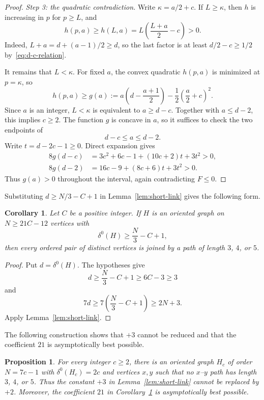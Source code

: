 \documentclass[11pt]{amsart}
\newtheorem{proposition}[theorem]{Proposition}
\newtheorem{corollary}[theorem]{Corollary}
\theoremstyle{definition}
\begin{document}
\begin{proof}
\smallskip
\noindent\emph{Step 3: the quadratic contradiction.}
Write $\kappa=a/2+c$.  If $L\ge\kappa$, then $h$ is increasing in
$p$ for $p\ge L$, and
\[
  h(p,a)\ge h(L,a)
  =L\left(\frac{L+a}{2}-c\right)>0.
\]
Indeed, $L+a=d+(a-1)/2\ge d$, so the last factor is at least
$d/2-c\ge1/2$ by~\eqref{eq:d-c-relation}.

It remains that $L<\kappa$.  For fixed $a$, the convex quadratic
$h(p,a)$ is minimized at $p=\kappa$, so
\[
  h(p,a)\ge
  g(a):=a\left(d-\frac{a+1}{2}\right)
  -\frac12\left(\frac a2+c\right)^2.
\]
Since $a$ is an integer, $L<\kappa$ is equivalent to
$a\ge d-c$.  Together with $a\le d-2$, this implies $c\ge2$.
The function $g$ is concave in $a$, so it suffices to check the two
endpoints of
\[
  d-c\le a\le d-2.
\]
Write $t=d-2c-1\ge0$.  Direct expansion gives
\begin{align*}
  8g(d-c)
  &=3c^2+6c-1+(10c+2)t+3t^2>0,\\
  8g(d-2)
  &=16c-9+(8c+6)t+3t^2>0.
\end{align*}
Thus $g(a)>0$ throughout the interval, again contradicting $F\le0$.
\end{proof}

Substituting $d\ge N/3-C+1$ in Lemma~\ref{lem:short-link} gives the
following form.

\begin{corollary}\label{cor:defect-link}
Let $C$ be a positive integer.  If $H$ is an oriented graph on
$N\ge21C-12$ vertices with
\[
  \delta^0(H)\ge\frac N3-C+1,
\]
then every ordered pair of distinct vertices is joined by a path of
length $3$, $4$, or $5$.
\end{corollary}

\begin{proof}
Put $d=\delta^0(H)$.  The hypotheses give
\[
  d\ge\frac N3-C+1\ge6C-3\ge3
\]
and
\[
  7d\ge7\left(\frac N3-C+1\right)\ge2N+3.
\]
Apply Lemma~\ref{lem:short-link}.
\end{proof}

The following construction shows that $+3$ cannot be reduced and that
the coefficient $21$ is asymptotically best possible.

\begin{proposition}\label{prop:link-sharp}
For every integer $c\ge2$, there is an oriented graph $H_c$ of order
$N=7c-1$ with $\delta^0(H_c)=2c$ and vertices $x,y$ such that no
$x$--$y$ path has length $3$, $4$, or $5$.  Thus the constant $+3$
in Lemma~\ref{lem:short-link} cannot be replaced by $+2$.  Moreover,
the coefficient $21$ in Corollary~\ref{cor:defect-link} is
asymptotically best possible.
\end{proposition}
\end{document}
